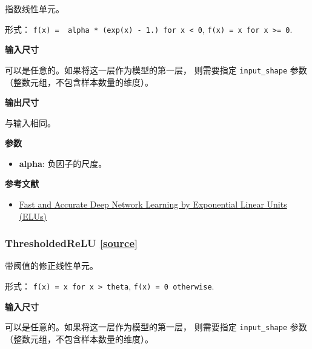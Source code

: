 \begin{Shaded}
\begin{Highlighting}[]
\OperatorTok{=}\NormalTok{)}
\end{Highlighting}
\end{Shaded}

指数线性单元。

形式：
\texttt{f(x)\ =\ \ alpha\ *\ (exp(x)\ -\ 1.)\ for\ x\ \textless{}\ 0},
\texttt{f(x)\ =\ x\ for\ x\ \textgreater{}=\ 0}.

\textbf{输入尺寸}

可以是任意的。如果将这一层作为模型的第一层， 则需要指定
\texttt{input\_shape} 参数 （整数元组，不包含样本数量的维度）。

\textbf{输出尺寸}

与输入相同。

\textbf{参数}

\begin{itemize}
\tightlist
\item
  \textbf{alpha}: 负因子的尺度。
\end{itemize}

\textbf{参考文献}

\begin{itemize}
\tightlist
\item
  \href{https://arxiv.org/abs/1511.07289v1}{Fast and Accurate Deep
  Network Learning by Exponential Linear Units (ELUs)}
\end{itemize}



\subsubsection{ThresholdedReLU {\href{https://github.com/keras-team/keras/blob/master/keras/layers/advanced_activations.py\#L191}{{[}source{]}}}}

\begin{Shaded}
\begin{Highlighting}[]
\OperatorTok{=}\NormalTok{)}
\end{Highlighting}
\end{Shaded}

带阈值的修正线性单元。

形式： \texttt{f(x)\ =\ x\ for\ x\ \textgreater{}\ theta},
\texttt{f(x)\ =\ 0\ otherwise}.

\textbf{输入尺寸}

可以是任意的。如果将这一层作为模型的第一层， 则需要指定
\texttt{input\_shape} 参数 （整数元组，不包含样本数量的维度）。

